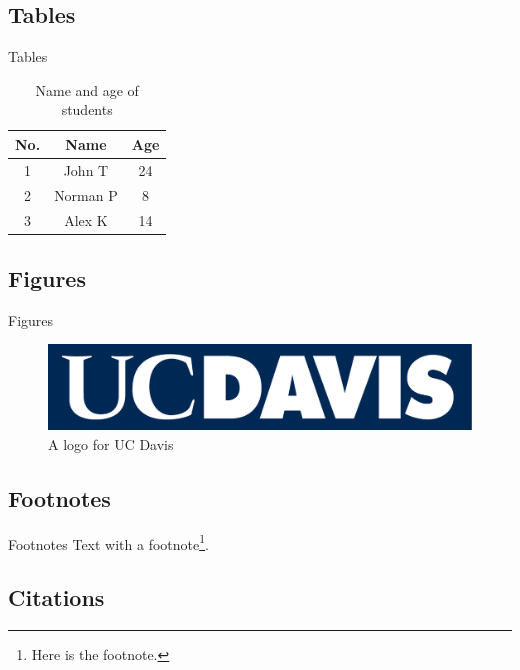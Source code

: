 \documentclass{beamer}
\begin{document}
    \subsection{Tables}

    \begin{frame}{Tables}

    \begin{table}
    \begin{tabular}{| c || c | c |}
        \hline
        No. & Name & Age \\
        \hline \hline
        1 & John T & 24 \\
        2 & Norman P & 8 \\
        3 & Alex K & 14 \\ 
        \hline
    \end{tabular}
    \caption{Name and age of students}
    \end{table}

    \end{frame}

    \subsection{Figures}

    \begin{frame}{Figures}
    \begin{figure}
        \includegraphics[width=0.8\linewidth]{DavisLogoV3.png}
        \caption{A logo for UC Davis}
    \end{figure}
    \end{frame}

    \subsection{Footnotes}

    \begin{frame}{Footnotes}
        Text with a footnote\footnote{Here is the footnote.}.
    \end{frame}

    \subsection{Citations}
\end{document}
